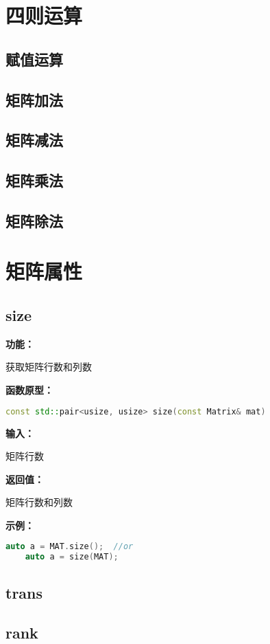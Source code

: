 \documentclass[UTF8]{ctexart}
\begin{document}
\section{四则运算}
\subsection{赋值运算}
\subsection{矩阵加法}
\subsection{矩阵减法}
\subsection{矩阵乘法}
\subsection{矩阵除法}

\section{矩阵属性}
\subsection{size}
\textbf{功能：}

获取矩阵行数和列数

\textbf{函数原型：}
{
    \setmainfont{Consolas}
    \begin{lstlisting}[language=C++]
    const std::pair<usize, usize> size(const Matrix& mat)
    \end{lstlisting}
}

\textbf{输入：}

矩阵行数

\textbf{返回值：}

矩阵行数和列数

\textbf{示例：}
{
    \setmainfont{Consolas}
    \begin{lstlisting}[language=C++]
    auto a = MAT.size();  //or 
    auto a = size(MAT);
    \end{lstlisting}
}

\subsection{trans}
\subsection{rank}
\end{document}
